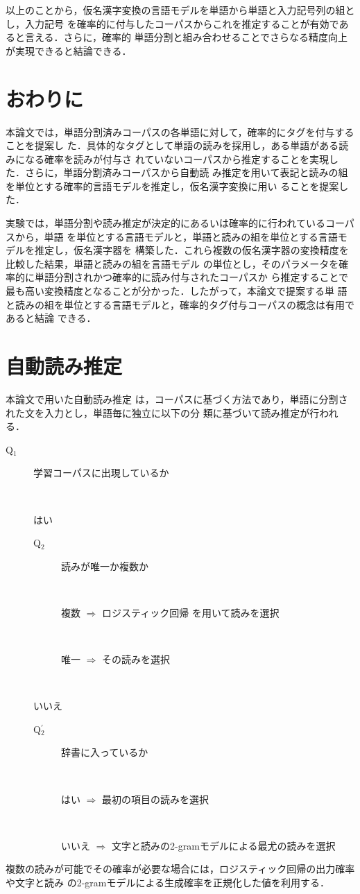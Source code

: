 \documentclass[japanese]{jnlp_JS2.0}
\begin{document}
以上のことから，仮名漢字変換の言語モデルを単語から単語と入力記号列の組とし，入力記号
を確率的に付与したコーパスからこれを推定することが有効であると言える．さらに，確率的
単語分割と組み合わせることでさらなる精度向上が実現できると結論できる．

\section{おわりに}

本論文では，単語分割済みコーパスの各単語に対して，確率的にタグを付与することを提案し
た．具体的なタグとして単語の読みを採用し，ある単語がある読みになる確率を読みが付与さ
れていないコーパスから推定することを実現した．さらに，単語分割済みコーパスから自動読
み推定を用いて表記と読みの組を単位とする確率的言語モデルを推定し，仮名漢字変換に用い
ることを提案した．

実験では，単語分割や読み推定が決定的にあるいは確率的に行われているコーパスから，単語
を単位とする言語モデルと，単語と読みの組を単位とする言語モデルを推定し，仮名漢字器を
構築した．これら複数の仮名漢字器の変換精度を比較した結果，単語と読みの組を言語モデル
の単位とし，そのパラメータを確率的に単語分割されかつ確率的に読み付与されたコーパスか
ら推定することで最も高い変換精度となることが分かった．したがって，本論文で提案する単
語と読みの組を単位とする言語モデルと，確率的タグ付与コーパスの概念は有用であると結論
できる．

\appendix

\newtheorem{命題}{}
\newtheorem{証明}{}


\section{自動読み推定}
\label{appe:kytea}

本論文で用いた自動読み推定\cite{仮名漢字変換ログの活用による言語処理精度の自動向上}
は，コーパスに基づく方法であり，単語に分割された文を入力とし，単語毎に独立に以下の分
類に基づいて読み推定が行われる．
\begin{description}
\item[Q$_1$] 学習コーパスに出現しているか
\item[\ ] はい
  \begin{description}
  \item[Q$_2$] 読みが唯一か複数か
  \item[\ ] 複数 $\Rightarrow$ ロジスティック回帰
    \cite{LIBLINEAR:.A.Library.for.Large.Linear.Classication}を用いて読みを選択
  \item[\ ] 唯一 $\Rightarrow$ その読みを選択
  \end{description}
\item[\ ] いいえ
  \begin{description}
  \item[Q$_2^{'}$] 辞書に入っているか
  \item[\ ] はい $\Rightarrow$ 最初の項目の読みを選択
  \item[\ ] いいえ $\Rightarrow$ 文字と読みの2-gramモデルによる最尤の読みを選択
  \end{description}
\end{description}
複数の読みが可能でその確率が必要な場合には，ロジスティック回帰の出力確率や文字と読み
の2-gramモデルによる生成確率を正規化した値を利用する．
\end{document}
